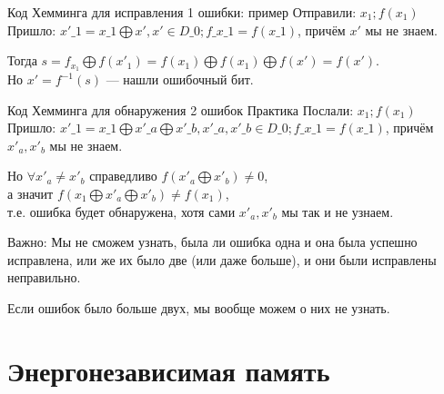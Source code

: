 \documentclass[xetex,aspectratio=43]{beamer}
\begin{document}
\begin{frame}{Код Хемминга для исправления 1 ошибки: пример}
Отправили: \(x_1; f(x_1)\)\\
Пришло: \(x'\_1 = x\_1 \bigoplus x', x' \in D\_0; f\_{x\_1} = f(x\_1)\),
причём \(x'\) мы не знаем.

Тогда
\(s = f_{x_1} \bigoplus f(x'_1) = f(x_1) \bigoplus f(x_1) \bigoplus f (x') = f(x').\)\\
Но \(x' = f^{-1}(s)\) --- нашли ошибочный бит.
\end{frame}

\begin{frame}{Код Хемминга для обнаружения 2 ошибок}
Практика Послали: \(x_1; f(x_1)\)\\
Пришло:
\(x'\_1 = x\_1 \bigoplus x'\_a \bigoplus x'\_b, x'\_a, x'\_b \in D\_0; f\_{x\_1} = f(x\_1)\),
причём \(x'_a, x'_b\) мы не знаем.

Но \(\forall x'_a \not = x'_b\) справедливо
\(f(x'_a \bigoplus x'_b) \not = 0\),\\
а значит \(f(x_1 \bigoplus x'_a \bigoplus x'_b) \neq f(x_1)\),\\
т.е. ошибка будет обнаружена, хотя сами \(x'_a, x'_b\) мы так и не
узнаем.

\pause

Важно: Мы не сможем узнать, была ли ошибка одна и она была успешно
исправлена, или же их было две (или даже больше), и они были исправлены
неправильно.

Если ошибок было больше двух, мы вообще можем о них не узнать.

\end{frame}

\section{Энергонезависимая память}
\end{document}
